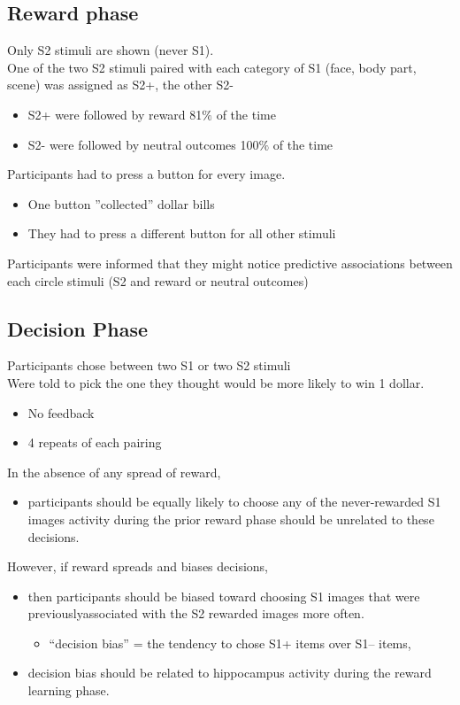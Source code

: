 \subsection{Reward phase}
Only S2 stimuli are shown (never S1). 
\\One of the two S2 stimuli paired with each category
of S1 (face, body part, scene) was assigned as
S2+, the other S2-
\begin{itemize}
    \item S2+ were followed by reward 81$\%$ of the time
    \item S2- were followed by neutral outcomes 100$\%$
of the time
\end{itemize} 
Participants had to press a button for every image.
\begin{itemize}
    \item One button ”collected” dollar bills
\item They had to press a different button for all
other stimuli
\end{itemize}
Participants were informed that they might notice predictive associations between each circle stimuli (S2 and reward or neutral outcomes)
\subsection{Decision Phase}
Participants chose between two S1 or two S2 stimuli
\\Were told to pick the one they thought would be
more likely to win 1 dollar.
\begin{itemize}
    \item No feedback
    \item 4 repeats of each pairing

\end{itemize}
In the absence of any spread of reward,
\begin{itemize}
    \item participants should be equally likely to choose any of the never-rewarded S1 images
    \itembrain activity during the prior reward phase should be unrelated to these decisions.
\end{itemize}
However, if reward spreads and biases decisions,
\begin{itemize}
    \item then participants should be biased toward choosing S1 images that were previouslyassociated with the S2 rewarded images more often.
    \begin{itemize}
        \item “decision bias” = the tendency to chose S1+ items over S1– items,
    \end{itemize}
    \item decision bias should be related to hippocampus activity during the reward learning
phase.
\end{itemize}
